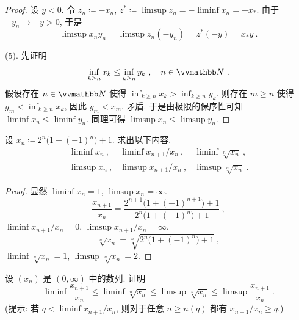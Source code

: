 \begin{proof}
    设 \(y < 0\). 令 \(z_n \coloneqq - x_n\), \(z^\ast \coloneqq \limsup z_n = - \liminf x_n = - x_\ast\). 由于 \(- y_n \to - y > 0\), 于是
    \[
        \limsup x_n y_n = \limsup z_n (- y_n) = z^\ast (- y) = x_\ast y\ .
    \]

    (5). 先证明
    \[
        \inf_{k \geq n} x_k \leq \inf_{k \geq n} y_k\ ,\quad n \in \N\ .
    \]
    假设存在 \(n \in \N\) 使得 \(\inf_{k \geq n} x_k > \inf_{k \geq n} y_k\). 则存在 \(m \geq n\) 使得 \(y_m < \inf_{k \geq n} x_k\), 因此 \(y_m < x_m\), 矛盾. 于是由极限的保序性可知 \(\liminf x_n \leq \liminf y_n\). 同理可得 \(\limsup x_n \leq \limsup y_n\).
\end{proof}

\begin{exercise}
    设 \(x_n \coloneqq 2^n \bigl(1 + (- 1)^n\bigr) + 1\). 求出以下内容.
    \[
        \begin{array}{lll}
            \liminf x_n\ , & \liminf x_{n + 1} / x_n\ , & \liminf \sqrt[n]{x_n}\ , \\
            \limsup x_n\ , & \limsup x_{n + 1} / x_n\ , & \limsup \sqrt[n]{x_n}\ .
        \end{array}
    \]
\end{exercise}

\begin{proof}
    显然 \(\liminf x_n = 1\), \(\limsup x_n = \infty\).
    \[
        \frac{x_{n + 1}}{x_n} = \frac{2^{n + 1} \bigl(1 + (- 1)^{n + 1}\bigr) + 1}{2^n \bigl(1 + (- 1)^n\bigr) + 1}\ ,
    \]
    \(\liminf x_{n + 1} / x_n = 0\), \(\limsup x_{n + 1} / x_n = \infty\).
    \[
        \sqrt[n]{x_n} = \sqrt[n]{2^n \bigl(1 + (- 1)^n\bigr) + 1}\ ,
    \]
    \(\liminf \sqrt[n]{x_n} = 1\), \(\limsup \sqrt[n]{x_n} = 2\).
\end{proof}

\begin{exercise}\label{ex:limit-superior-and-inferior-with-root-and-ratio}
    设 \((x_n)\) 是 \((0, \infty)\) 中的数列. 证明
    \[
        \liminf \frac{x_{n + 1}}{x_n} \leq \liminf \sqrt[n]{x_n} \leq \limsup \sqrt[n]{x_n} \leq \limsup \frac{x_{n + 1}}{x_n}\ .
    \]
    (提示: 若 \(q < \liminf x_{n + 1} / x_n\), 则对于任意 \(n \geq n(q)\) 都有 \(x_{n + 1} / x_n \geq q\).)
\end{exercise}

